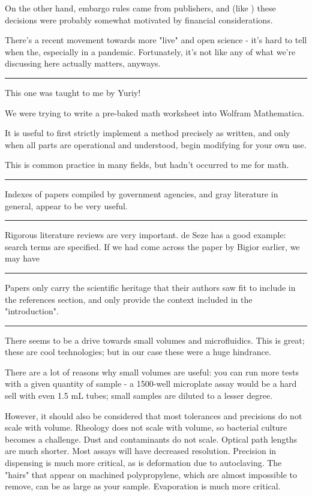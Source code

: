 \documentclass[paper.tex]{subfiles}
\begin{document}
On the other hand, embargo rules came from publishers, and (like ) these decisions were probably somewhat motivated by financial considerations.

There's a recent movement towards more "live" and open science - it's hard to tell when the, especially in a pandemic. Fortunately, it's not like any of what we're discussing here actually matters, anyways.

\rule{\linewidth}{0.2pt}

This one was taught to me by Yuriy!

We were trying to write a pre-baked math worksheet into Wolfram Mathematica.

It is useful to first strictly implement a method precisely as written, and only when all parts are operational and understood, begin modifying for your own use.

This is common practice in many fields, but hadn't occurred to me for math. 

\rule{\linewidth}{0.2pt}

Indexes of papers compiled by government agencies, and gray literature in general, appear to be very useful.

\rule{\linewidth}{0.2pt}

Rigorous literature reviews are very important. de Seze has a good example: search terms are specified. If we had come across the paper by Bigior earlier, we may have

\rule{\linewidth}{0.2pt}

Papers only carry the scientific heritage that their authors saw fit to include in the references section, and only provide the context included in the "introduction". 

\rule{\linewidth}{0.2pt}

There seems to be a drive towards small volumes and microfluidics. This is great; these are cool technologies; but in our case these were a huge hindrance.

There are a lot of reasons why small volumes are useful: you can run more tests with a given quantity of sample - a 1500-well microplate assay would be a hard sell with even 1.5 mL tubes; small samples are diluted to a lesser degree. 

However, it should also be considered that most tolerances and precisions do not scale with volume. 
Rheology does not scale with volume, so bacterial culture becomes a challenge. Dust and contaminants do not scale. Optical path lengths are much shorter. Most assays will have decreased resolution. Precision in dispensing is much more critical, as is deformation due to autoclaving. The "hairs" that appear on machined polypropylene, which are almost impossible to remove, can be as large as your sample. Evaporation is much more critical.
\end{document}

